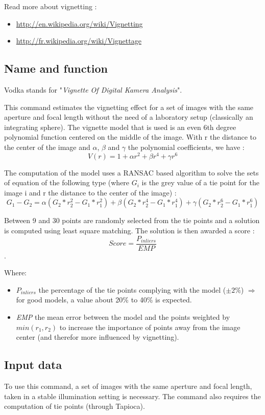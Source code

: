 Read more about vignetting :
\begin{itemize}
   \item \url{http://en.wikipedia.org/wiki/Vignetting}
   \item \url{http://fr.wikipedia.org/wiki/Vignettage}
\end{itemize}

\subsection{Name and function}
Vodka stands for "\textit{Vignette Of Digital Kamera Analysis}".

This command estimates the vignetting effect for a set of images with the same aperture and focal length without the need of a laboratory setup (classically an integrating sphere). The vignette model that is used is an even 6th degree polynomial function centered on the middle of the image. With r the distance to the center of the image and $\alpha$, $\beta$ and $\gamma$ the polynomial coefficients, we have : \[V(r)=1+ \alpha r^2 + \beta r^4 + \gamma r^6\]


The computation of the model uses a RANSAC based algorithm to solve the sets of equation of the following type (where $G_{i}$ is the grey value of a tie point for the image i and r the distance to the center of the image) : \[ G_{1}-G_{2}=\alpha(G_{2}*r_{2}^2-G_{1}*r_{1}^2)+\beta(G_{2}*r_{2}^4-G_{1}*r_{1}^4)+\gamma(G_{2}*r_{2}^6-G_{1}*r_{1}^6) \]

Between 9 and 30 points are randomly selected from the tie points and a solution is computed using least square matching. The solution is then awarded a score : \[Score=\frac{P_{inliers}}{EMP}\].

Where:
\begin{itemize}
\item \textit{$P_{inliers}$} the percentage of the tie points complying with the model ($\pm 2\%$) $\Rightarrow$ for good models, a value about 20\% to 40\% is expected.

\item \textit{EMP} the mean error between the model and the points weighted by $min(r_{1},r_{2})$ to increase the importance of points away from the image center (and therefor more influenced by vignetting).
\end{itemize}


\subsection{Input data}
To use this command, a set of images with the same aperture and focal length, taken in a stable illumination setting is necessary. The command also requires the computation of tie points (through Tapioca).



